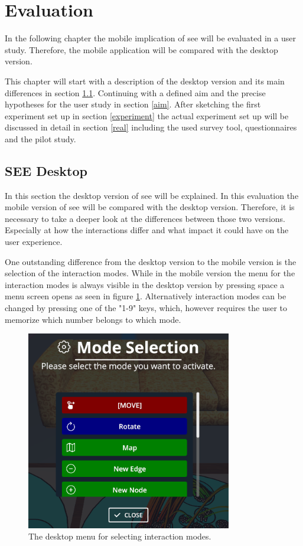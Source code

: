 \section{Evaluation}
\label{section:evaluation}
In the following chapter the mobile implication of \gls{see} will be evaluated in a user study.
Therefore, the mobile application will be compared with the desktop version.

This chapter will start with a description of the desktop version and its main differences in section \ref{desktop}.
Continuing with a defined aim and the precise hypotheses for the user study in section \ref{aim}.
After sketching the first experiment set up in section \ref{experiment} the actual experiment set up will be discussed in detail in section \ref{real} including the used survey tool, questionnaires and the pilot study.
\subsection{SEE Desktop}
\label{desktop}
In this section the desktop version of \gls{see} will be explained.
In this evaluation the mobile version of \gls{see} will be compared with the desktop version.
Therefore, it is necessary to take a deeper look at the differences between those two versions.
Especially at how the interactions differ and what impact it could have on the user experience.

One outstanding difference from the desktop version to the mobile version is the selection of the interaction modes.
While in the mobile version the menu for the interaction modes is always visible in the desktop version by pressing space a menu screen opens as seen in figure \ref{fig:menu}.
Alternatively interaction modes can be changed by pressing one of the "1-9" keys, which, however requires the user to memorize which number belongs to which mode.

\begin{figure}[htb]
  \centering
  \includegraphics[width=0.8\textwidth]{Evaluation/img/menu.png}
  \caption{The desktop menu for selecting interaction modes.}\label{fig:menu}
\end{figure}

